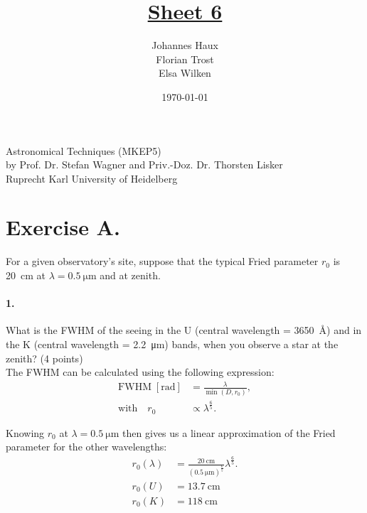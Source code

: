 \documentclass[11pt,a4paper,twoside]{article}
\title{\LARGE \underline {Sheet 6}}
\author{Johannes Haux \\ Florian Trost \\ Elsa Wilken}
\date{\today}
\newcommand{\op}[1]{\operatorname{#1}}
\begin{document}
\maketitle
\thispagestyle{empty}

\begin{center}
  Astronomical Techniques (MKEP5) \\
  \baselineskip35pt
  by Prof. Dr. Stefan Wagner and Priv.-Doz. Dr. Thorsten Lisker \\
  \baselineskip60pt
  Ruprecht Karl University of Heidelberg
\vskip 40pt

\end{center}

\newpage
\setcounter{page}{1}		%

\section*{Exercise A.}
For a given observatory's site, suppose that the typical Fried parameter $r_0$
is \SI{20}{\centi\meter} at $\lambda = \SI{0.5}{\micro\meter}$ and at zenith.  

\paragraph{1.} What is the FWHM of the seeing in the U (central wavelength =
\SI{3650}{\angstrom}) and in the K (central wavelength =
\SI{2.2}{\micro\meter}) bands, when you observe a star at the zenith? (4
points) \\

The FWHM can be calculated using the following expression:
\begin{align}
\mathrm{FWHM} \;[\si{\radian}] &= \frac{\lambda}{\op{min}\left(D, r_0 \right)}, \\ \label{eq:S0}
\text{with} \quad r_0 &\propto \lambda^{\frac{6}{5}}.
\end{align}

Knowing $r_0$ at $\lambda = \SI{0.5}{\micro\meter}$ then gives us a linear 
approximation of the Fried parameter for the other wavelengths:
\begin{align}
r_0(\lambda) &= \frac{\SI{20}{\centi\meter}}
                     {\left(\SI{0.5}{\micro\meter}\right)^{\frac{6}{5}}}
                \lambda^{\frac{6}{5}}. \\ \label{eq:r0}
r_0(U) &= \SI{13.7}{\centi\meter}   \\
r_0(K) &= \SI{118}{\centi\meter}
\end{align}
\end{document}
